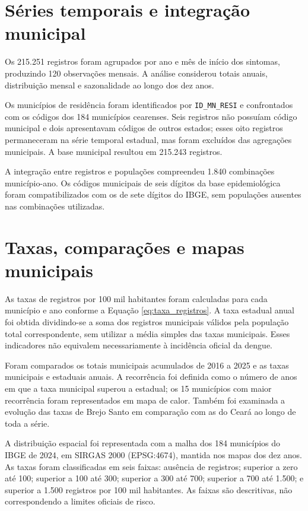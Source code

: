 \section{Séries temporais e integração municipal}
\label{sec:series_temporais}

Os 215.251 registros foram agrupados por ano e mês de início dos sintomas, produzindo 120 observações mensais. A análise considerou totais anuais, distribuição mensal e sazonalidade ao longo dos dez anos.

Os municípios de residência foram identificados por \texttt{ID\_MN\_RESI} e confrontados com os códigos dos 184 municípios cearenses. Seis registros não possuíam código municipal e dois apresentavam códigos de outros estados; esses oito registros permaneceram na série temporal estadual, mas foram excluídos das agregações municipais. A base municipal resultou em 215.243 registros.

A integração entre registros e populações compreendeu 1.840 combinações município-ano. Os códigos municipais de seis dígitos da base epidemiológica foram compatibilizados com os de sete dígitos do IBGE, sem populações ausentes nas combinações utilizadas.

\section{Taxas, comparações e mapas municipais}
\label{sec:calculo_taxas}

As taxas de registros por 100 mil habitantes foram calculadas para cada município e ano conforme a Equação \ref{eq:taxa_registros}. A taxa estadual anual foi obtida dividindo-se a soma dos registros municipais válidos pela população total correspondente, sem utilizar a média simples das taxas municipais. Esses indicadores não equivalem necessariamente à incidência oficial da dengue.

Foram comparados os totais municipais acumulados de 2016 a 2025 e as taxas municipais e estaduais anuais. A recorrência foi definida como o número de anos em que a taxa municipal superou a estadual; os 15 municípios com maior recorrência foram representados em mapa de calor. Também foi examinada a evolução das taxas de Brejo Santo em comparação com as do Ceará ao longo de toda a série.

A distribuição espacial foi representada com a malha dos 184 municípios do IBGE de 2024, em SIRGAS 2000 (EPSG:4674), mantida nos mapas dos dez anos. As taxas foram classificadas em seis faixas: ausência de registros; superior a zero até 100; superior a 100 até 300; superior a 300 até 700; superior a 700 até 1.500; e superior a 1.500 registros por 100 mil habitantes. As faixas são descritivas, não correspondendo a limites oficiais de risco.

